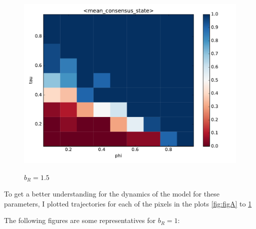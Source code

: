 \begin{minipage}{.55 \textwidth}
	\begin{figure}[H]
		\centering
		\includegraphics[width = \linewidth]{figures/mean_consensus_stateb_r1o5.pdf}

	\end{figure}
\end{minipage}\begin{minipage}{.33 \textwidth}
	\begin{figure}[H]
		\caption{$b_R = 1.5$\label{fig:figC}}
	\end{figure}
\end{minipage}
To get a better understanding for the dynamics of the model for these parameters, I plotted trajectories for each of the pixels in the plots \ref{fig:figA} to \ref{fig:figC} 

The following figures are some representatives for $b_R=1$:

